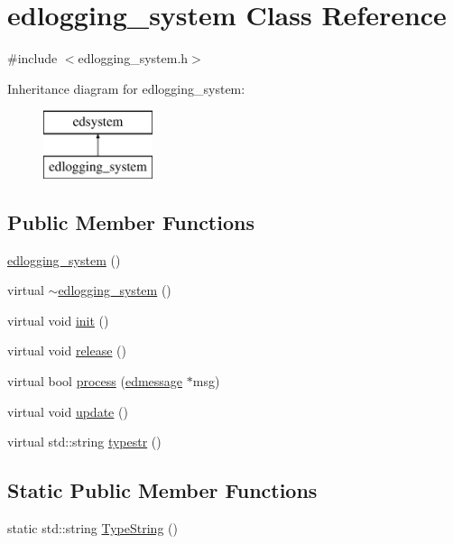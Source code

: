 \hypertarget{classedlogging__system}{\section{edlogging\-\_\-system Class Reference}
\label{classedlogging__system}
}


{\ttfamily \#include $<$edlogging\-\_\-system.\-h$>$}

Inheritance diagram for edlogging\-\_\-system\-:\begin{figure}[H]
\begin{center}
\leavevmode
\includegraphics[height=2.000000cm]{classedlogging__system}
\end{center}
\end{figure}
\subsection*{Public Member Functions}
\begin{DoxyCompactItemize}
\item 
\hyperlink{classedlogging__system_ad42113de3431c1655171133d9737a911}{edlogging\-\_\-system} ()
\item 
virtual \hyperlink{classedlogging__system_a0a8901c2649e1d0341fcfb9131e64a72}{$\sim$edlogging\-\_\-system} ()
\item 
virtual void \hyperlink{classedlogging__system_a393094d06bb5d15155be58286f0a5185}{init} ()
\item 
virtual void \hyperlink{classedlogging__system_ad959e6d140397e22953b2b7d1738456a}{release} ()
\item 
virtual bool \hyperlink{classedlogging__system_aa1d63881863c61a89e80aa8187b8d19d}{process} (\hyperlink{structedmessage}{edmessage} $\ast$msg)
\item 
virtual void \hyperlink{classedlogging__system_ac9b9dd8d391244acdea02666a56f8440}{update} ()
\item 
virtual std\-::string \hyperlink{classedlogging__system_ad1262db654a7d7acee6b217a09588170}{typestr} ()
\end{DoxyCompactItemize}
\subsection*{Static Public Member Functions}
\begin{DoxyCompactItemize}
\item 
static std\-::string \hyperlink{classedlogging__system_a5839237a03a9902f0c2311fc3b664f7b}{Type\-String} ()
\end{DoxyCompactItemize}


